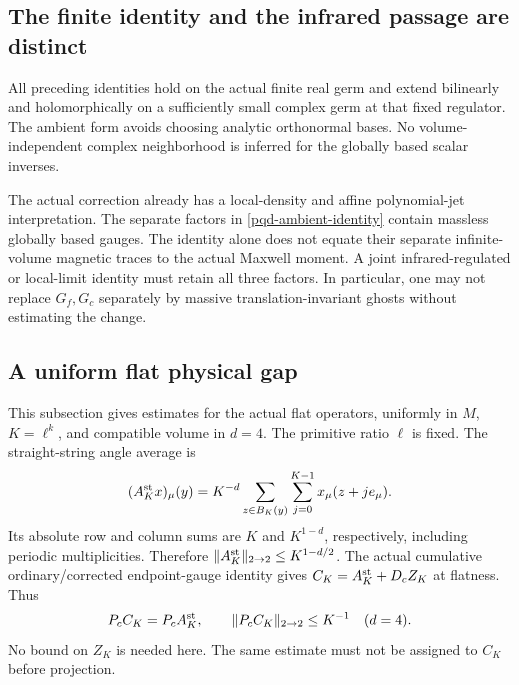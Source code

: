 \documentclass[11pt]{article}
\theoremstyle{remark}
\begin{document}
\subsection{The finite identity and the infrared passage are distinct}
\label{pqd-scope}

All preceding identities hold on the actual finite real germ and extend
bilinearly and holomorphically on a sufficiently small complex germ at
that fixed regulator. The ambient form avoids choosing analytic
orthonormal bases. No volume-independent complex neighborhood is
inferred for the globally based scalar inverses.

The actual correction already has a local-density and affine
polynomial-jet interpretation. The separate factors in
\eqref{pqd-ambient-identity} contain massless globally based gauges.
The identity alone does not equate their separate infinite-volume
magnetic traces to the actual Maxwell moment. A joint infrared-regulated
or local-limit identity must retain all three factors. In particular,
one may not replace $G_f,G_c$ separately by massive translation-invariant
ghosts without estimating the change.

\subsection{A uniform flat physical gap}
\label{pqd-flat-section}

This subsection gives estimates for the actual flat operators, uniformly
in $M$, $K=\ell^k$, and compatible volume in $d=4$. The primitive ratio
$\ell$ is fixed. The straight-string angle average is
\begin{equation}
 (A_K^{\rm st}x)_\mu(y)=K^{-d}
 \sum_{z\in B_K(y)}\sum_{j=0}^{K-1}x_\mu(z+je_\mu).
 \label{pqd-angle-average}
\end{equation}
Its absolute row and column sums are $K$ and $K^{1-d}$, respectively,
including periodic multiplicities. Therefore
$\|A_K^{\rm st}\|_{2\to2}\le K^{1-d/2}$.
The actual cumulative ordinary/corrected endpoint-gauge identity gives
$C_K=A_K^{\rm st}+D_c Z_K$ at flatness. Thus
\begin{equation}
 P_cC_K=P_cA_K^{\rm st},\qquad
 \|P_cC_K\|_{2\to2}\le K^{-1}\quad(d=4).
 \label{pqd-projected-bound}
\end{equation}
No bound on $Z_K$ is needed here. The same estimate must not be assigned
to $C_K$ before projection.
\end{document}
